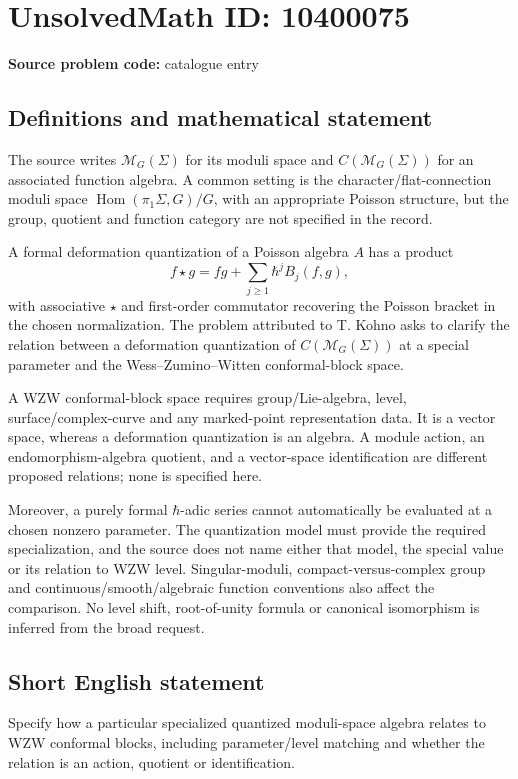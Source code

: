 \documentclass[11pt]{article}
\begin{document}
\section*{UnsolvedMath ID: 10400075}
\textbf{Source problem code:} catalogue entry
\subsection{Definitions and mathematical statement}
The source writes $\mathcal M_G(\Sigma)$ for its moduli space and $C(\mathcal M_G(\Sigma))$ for an associated function algebra. A common setting is the character/flat-connection moduli space $\operatorname{Hom}(\pi_1\Sigma,G)/G$, with an appropriate Poisson structure, but the group, quotient and function category are not specified in the record.

A formal deformation quantization of a Poisson algebra $A$ has a product
\[
f\star g=fg+\sum_{j\geq1}\hbar^jB_j(f,g),
\]
with associative $\star$ and first-order commutator recovering the Poisson bracket in the chosen normalization. The problem attributed to T. Kohno asks to clarify the relation between a deformation quantization of $C(\mathcal M_G(\Sigma))$ at a special parameter and the Wess--Zumino--Witten conformal-block space.

A WZW conformal-block space requires group/Lie-algebra, level, surface/complex-curve and any marked-point representation data. It is a vector space, whereas a deformation quantization is an algebra. A module action, an endomorphism-algebra quotient, and a vector-space identification are different proposed relations; none is specified here.

Moreover, a purely formal $\hbar$-adic series cannot automatically be evaluated at a chosen nonzero parameter. The quantization model must provide the required specialization, and the source does not name either that model, the special value or its relation to WZW level. Singular-moduli, compact-versus-complex group and continuous/smooth/algebraic function conventions also affect the comparison. No level shift, root-of-unity formula or canonical isomorphism is inferred from the broad request.
\subsection{Short English statement}
Specify how a particular specialized quantized moduli-space algebra relates to WZW conformal blocks, including parameter/level matching and whether the relation is an action, quotient or identification.
\end{document}
